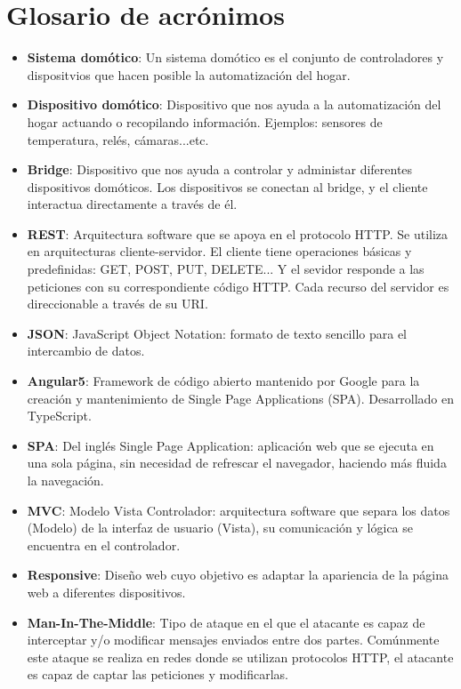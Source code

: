 \chapter*{Glosario de acrónimos}

\begin{itemize}
  
\item{\textbf{Sistema domótico}: Un sistema domótico es el conjunto de controladores y dispositvios que hacen posible la automatización del hogar.}
\item{\textbf{Dispositivo domótico}: Dispositivo que nos ayuda a la automatización del hogar actuando o recopilando información. Ejemplos: sensores de temperatura, relés, cámaras...etc. }
\item{\textbf{Bridge}: Dispositivo que nos ayuda a controlar y administar diferentes dispositivos domóticos. Los dispositivos se conectan al bridge, y el cliente interactua directamente a través de él. }
\item{\textbf{REST}: Arquitectura software que se apoya en el protocolo HTTP. Se utiliza en arquitecturas cliente-servidor. El cliente tiene operaciones básicas y predefinidas: GET, POST, PUT, DELETE... Y el sevidor responde a las peticiones con su correspondiente código HTTP.
Cada recurso del servidor es direccionable a través de su URI.}
\item{\textbf{JSON}: JavaScript Object Notation: formato de texto sencillo para el intercambio de datos.}
\item{\textbf{Angular5}: Framework de código abierto mantenido por Google para la creación y mantenimiento de Single Page Applications (SPA). Desarrollado en TypeScript. }
\item{\textbf{SPA}: Del inglés Single Page Application: aplicación web que se ejecuta en una sola página, sin necesidad de refrescar el navegador, haciendo más fluida la navegación.}
\item{\textbf{MVC}: Modelo Vista Controlador: arquitectura software que separa los datos (Modelo) de la interfaz de usuario (Vista), su comunicación y lógica se encuentra en el controlador.}
\item{\textbf{Responsive}: Diseño web cuyo objetivo es adaptar la apariencia de la página web a diferentes dispositivos.}
\item{\textbf{Man-In-The-Middle}: Tipo de ataque en el que el atacante es capaz de interceptar y/o modificar mensajes enviados entre dos partes. 
Comúnmente este ataque se realiza en redes donde se utilizan protocolos HTTP, el atacante es capaz de captar las peticiones y modificarlas.}
\end{itemize}

\newpage \thispagestyle{empty} %


